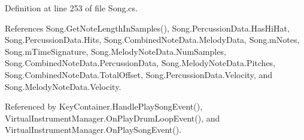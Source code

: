 Definition at line 253 of file Song.\+cs.



References Song.\+Get\+Note\+Length\+In\+Samples(), Song.\+Percussion\+Data.\+Has\+Hi\+Hat, Song.\+Percussion\+Data.\+Hits, Song.\+Combined\+Note\+Data.\+Melody\+Data, Song.\+m\+Notes, Song.\+m\+Time\+Signature, Song.\+Melody\+Note\+Data.\+Num\+Samples, Song.\+Combined\+Note\+Data.\+Percussion\+Data, Song.\+Melody\+Note\+Data.\+Pitches, Song.\+Combined\+Note\+Data.\+Total\+Offset, Song.\+Percussion\+Data.\+Velocity, and Song.\+Melody\+Note\+Data.\+Velocity.



Referenced by Key\+Container.\+Handle\+Play\+Song\+Event(), Virtual\+Instrument\+Manager.\+On\+Play\+Drum\+Loop\+Event(), and Virtual\+Instrument\+Manager.\+On\+Play\+Song\+Event().


